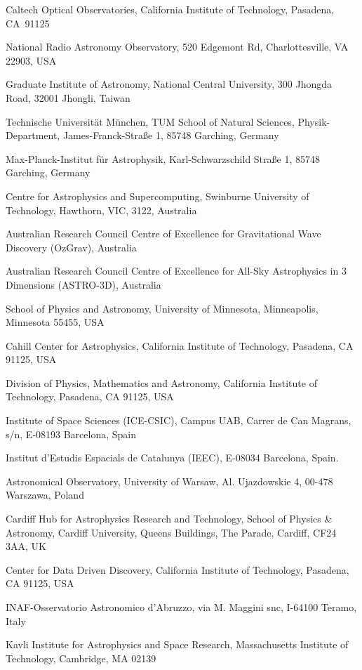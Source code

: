 \documentclass{nature_plusfigure}
\begin{document}
\begin{small}
\begin{affiliations}
\item Caltech Optical Observatories, California Institute of Technology, Pasadena, CA 91125
\item National Radio Astronomy Observatory, 520 Edgemont Rd, Charlottesville, VA 22903, USA
\item Graduate Institute of Astronomy, National Central University, 300 Jhongda Road, 32001 Jhongli, Taiwan
\item Technische Universit{\"a}t M{\"u}nchen, TUM School of Natural Sciences, Physik-Department, James-Franck-Stra{\ss}e 1, 85748 Garching, Germany
\item Max-Planck-Institut f{\"u}r Astrophysik, Karl-Schwarzschild Stra{\ss}e 1, 85748 Garching, Germany
\item Centre for Astrophysics and Supercomputing, Swinburne University of Technology, Hawthorn, VIC, 3122, Australia
\item Australian Research Council Centre of Excellence for Gravitational Wave Discovery (OzGrav), Australia
\item Australian Research Council Centre of Excellence for All-Sky Astrophysics in 3 Dimensions (ASTRO-3D), Australia
\item School of Physics and Astronomy, University of Minnesota, Minneapolis, Minnesota 55455, USA
\item Cahill Center for Astrophysics, California Institute of Technology, Pasadena, CA 91125, USA
\item Division of Physics, Mathematics and Astronomy, California Institute of Technology, Pasadena, CA 91125, USA
\item Institute of Space Sciences (ICE-CSIC), Campus UAB, Carrer de Can Magrans, s/n, E-08193 Barcelona, Spain
\item Institut d’Estudis Espacials de Catalunya (IEEC), E-08034 Barcelona, Spain.
\item Astronomical Observatory, University of Warsaw, Al. Ujazdowskie 4, 00-478 Warszawa, Poland
\item Cardiff Hub for Astrophysics Research and Technology, School of Physics \& Astronomy, Cardiff University, Queens Buildings, The Parade, Cardiff, CF24 3AA, UK
\item Center for Data Driven Discovery, California Institute of Technology, Pasadena, CA 91125, USA
\item INAF-Osservatorio Astronomico d’Abruzzo, via M. Maggini snc, I-64100 Teramo, Italy
\item Kavli Institute for Astrophysics and Space Research, Massachusetts Institute of Technology, Cambridge, MA 02139

\end{affiliations}
\end{small}
\end{document}
